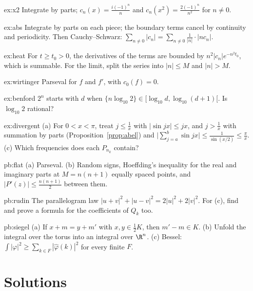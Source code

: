 \begin{hint}{ex:x2}
Integrate by parts; $c_n(x)=\frac{i(-1)^n}n$ and $c_n(x^2)=\frac{2(-1)^n}{n^2}$ for $n\ne0$.
\end{hint}
\begin{hint}{ex:abs}
Integrate by parts on each piece; the boundary terms cancel by continuity and periodicity. Then Cauchy--Schwarz:
$\sum_{n\ne0}|c_n|=\sum_{n\ne0}\frac1{|n|}\cdot|nc_n|$.
\end{hint}
\begin{hint}{ex:heat}
For $t\ge t_0>0$, the derivatives of the terms are bounded by $n^2|c_n|e^{-n^2t_0}$, which is summable. For the limit, split the series
into $|n|\le M$ and $|n|>M$.
\end{hint}
\begin{hint}{ex:wirtinger}
Parseval for $f$ and $f'$, with $c_0(f)=0$.
\end{hint}
\begin{hint}{ex:benford}
$2^n$ starts with $d$ when $\{n\log_{10}2\}\in\bigl[\log_{10}d,\log_{10}(d+1)\bigr[$. Is $\log_{10}2$ rational?
\end{hint}
\begin{hint}{ex:divergent}
(a) For $0<x<\pi$, treat $j\le\frac1x$ with $|\sin jx|\le jx$, and $j>\frac1x$ with summation by parts (Proposition~\ref{prop:abel}) and
$\bigl|\sum_{j=a}^b\sin jx\bigr|\le\frac1{\sin(x/2)}\le\frac\pi x$. (c) Which frequencies does each $P_{n_k}$ contain?
\end{hint}

\begin{hint}{pb:flat}
(a) Parseval. (b) Random signs, Hoeffding's inequality for the real and imaginary parts at $M=n(n+1)$ equally spaced points,
and $|P'(z)|\le\frac{n(n+1)}2$ between them.
\end{hint}

\begin{hint}{pb:rudin}
The parallelogram law $|u+v|^2+|u-v|^2=2|u|^2+2|v|^2$. For (c), find and prove a formula for the coefficients of $Q_k$ too.
\end{hint}

\begin{hint}{pb:siegel}
(a) If $x+m=y+m'$ with $x,y\in\frac12K$, then $m'-m\in K$. (b) Unfold the integral over the torus into an integral over $\R^n$. (c) Bessel:
$\int|\varphi|^2\ge\sum_{k\in F}|\hat\varphi(k)|^2$ for every finite $F$.
\end{hint}

\section{Solutions}

